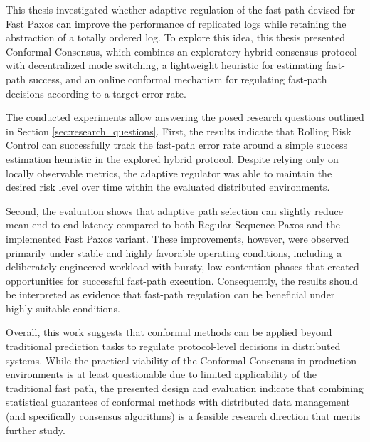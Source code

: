 This thesis investigated whether adaptive regulation of the fast path devised for Fast Paxos can improve the performance of replicated logs while retaining the abstraction of a totally ordered log. To explore this idea, this thesis presented Conformal Consensus, which combines an exploratory hybrid consensus protocol with decentralized mode switching, a lightweight heuristic for estimating fast-path success, and an online conformal mechanism for regulating fast-path decisions according to a target error rate.

The conducted experiments allow answering the posed research questions outlined in Section \ref{sec:research_questions}. First, the results indicate that Rolling Risk Control can successfully track the fast-path error rate around a simple success estimation heuristic in the explored hybrid protocol. Despite relying only on locally observable metrics, the adaptive regulator was able to maintain the desired risk level over time within the evaluated distributed environments.

Second, the evaluation shows that adaptive path selection can slightly reduce mean end-to-end latency compared to both Regular Sequence Paxos and the implemented Fast Paxos variant. These improvements, however, were observed primarily under stable and highly favorable operating conditions, including a deliberately engineered workload with bursty, low-contention phases that created opportunities for successful fast-path execution. Consequently, the results should be interpreted as evidence that fast-path regulation can be beneficial under highly suitable conditions.

Overall, this work suggests that conformal methods can be applied beyond traditional prediction tasks to regulate protocol-level decisions in distributed systems. While the practical viability of the Conformal Consensus in production environments is at least questionable due to limited applicability of the traditional fast path, the presented design and evaluation indicate that combining statistical guarantees of conformal methods with distributed data management (and specifically consensus algorithms) is a feasible research direction that merits further study.